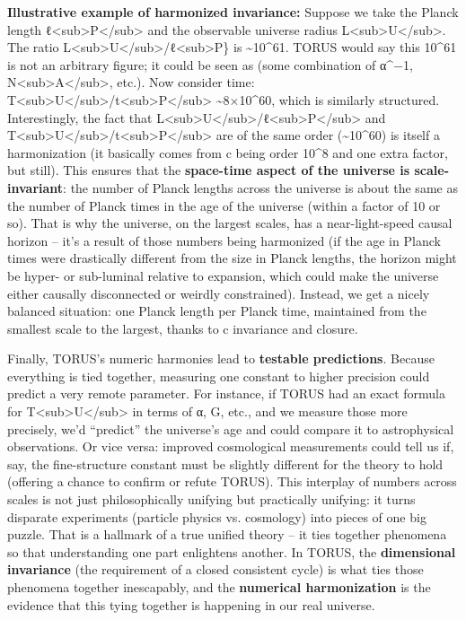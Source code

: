 \documentclass[
]{article}
\begin{document}
\textbf{Illustrative example of harmonized invariance:} Suppose we take
the Planck length
ℓ\textless sub\textgreater P\textless/sub\textgreater{} and the
observable universe radius
L\textless sub\textgreater U\textless/sub\textgreater. The ratio
L\textless sub\textgreater U\textless/sub\textgreater/ℓ\textless sub\textgreater P\}
is \textasciitilde10\^{}61. TORUS would say this 10\^{}61 is not an
arbitrary figure; it could be seen as (some combination of α\^{}−1,
N\textless sub\textgreater A\textless/sub\textgreater, etc.). Now
consider time:
T\textless sub\textgreater U\textless/sub\textgreater/t\textless sub\textgreater P\textless/sub\textgreater{}
\textasciitilde8×10\^{}60, which is similarly structured. Interestingly,
the fact that
L\textless sub\textgreater U\textless/sub\textgreater/ℓ\textless sub\textgreater P\textless/sub\textgreater{}
and
T\textless sub\textgreater U\textless/sub\textgreater/t\textless sub\textgreater P\textless/sub\textgreater{}
are of the same order (\textasciitilde10\^{}60) is itself a
harmonization (it basically comes from c being order 10\^{}8 and one
extra factor, but still). This ensures that the \textbf{space-time
aspect of the universe is scale-invariant}: the number of Planck lengths
across the universe is about the same as the number of Planck times in
the age of the universe (within a factor of 10 or so). That is why the
universe, on the largest scales, has a near-light-speed causal horizon
-- it's a result of those numbers being harmonized (if the age in Planck
times were drastically different from the size in Planck lengths, the
horizon might be hyper- or sub-luminal relative to expansion, which
could make the universe either causally disconnected or weirdly
constrained). Instead, we get a nicely balanced situation: one Planck
length per Planck time, maintained from the smallest scale to the
largest, thanks to c invariance and closure\hspace{0pt}.

Finally, TORUS's numeric harmonies lead to \textbf{testable
predictions}. Because everything is tied together, measuring one
constant to higher precision could predict a very remote parameter. For
instance, if TORUS had an exact formula for
T\textless sub\textgreater U\textless/sub\textgreater{} in terms of α,
G, etc., and we measure those more precisely, we'd ``predict'' the
universe's age and could compare it to astrophysical observations. Or
vice versa: improved cosmological measurements could tell us if, say,
the fine-structure constant must be slightly different for the theory to
hold (offering a chance to confirm or refute TORUS). This interplay of
numbers across scales is not just philosophically unifying but
practically unifying: it turns disparate experiments (particle physics
vs. cosmology) into pieces of one big puzzle. That is a hallmark of a
true unified theory -- it ties together phenomena so that understanding
one part enlightens another. In TORUS, the \textbf{dimensional
invariance} (the requirement of a closed consistent cycle) is what ties
those phenomena together inescapably, and the \textbf{numerical
harmonization} is the evidence that this tying together is happening in
our real universe\hspace{0pt}.
\end{document}
